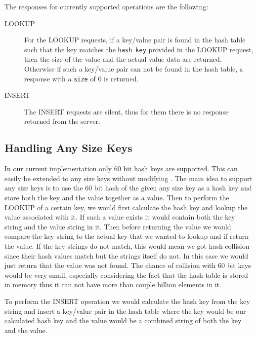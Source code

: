 The responses for currently supported operations are the following:
\begin{description}
\item[LOOKUP] For the LOOKUP requests, if a key/value pair is found in the hash table such that the key matches
the \texttt{hash key} provided in the LOOKUP request, then the size of the value and the actual value data are returned.
Otherwise if such a key/value pair can not be found in the hash table, a response with a \texttt{size} of 0 is
returned.
\item[INSERT] The INSERT requests are silent, thus for them there is no response returned from the server.
\end{description}

\subsection{Handling Any Size Keys}
\label{sec:anykey}

In our current implementation only 60 bit hash keys are supported. This can easily be extended to any size keys
without modifying \cpserver{}. The main idea to support any size keys is to use the 60 bit hash of the given any size key as a hash key and store both the 
key and the value together as a value. Then to perform the LOOKUP of a certain key, we would first calculate the hash key
and lookup the value associated with it. If such a value exists it would contain both the key string and the value string in
it. Then before returning the value we would compare the key string to the actual key that we wanted to lookup and if
return the value. If the key strings do not match, this would mean we got hash collision since their hash values match but the 
strings itself do not. In this case we would just return that the value was not found. The chance of collision with 60 bit keys 
would be very small, especially considering the fact that the hash table is stored in memory thus it can not have more than 
couple billion elements in it.

To perform the INSERT operation we would calculate the hash key from the key string and insert a key/value pair in the hash table
where the key would be our calculated hash key and the value would be a combined string of both the key and the value.

